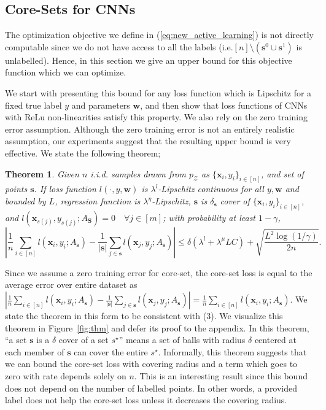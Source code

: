\documentclass{article} \usepackage{iclr2018_conference,times}
\makeatletter
\newtheorem{theorem}{Theorem}
\newcommand*{\ie}{i.e.\@\xspace}
\makeatother
\begin{document}
\subsection{Core-Sets for CNNs} 
The optimization objective we define in (\ref{eq:new_active_learning}) is not directly computable since we do not have
access to all the labels (\ie $[n] \setminus (\mathbf{s}^0 \cup \mathbf{s}^1)$ is unlabelled). Hence, in this section we
give an upper bound for this objective function which we can optimize. 

We start with presenting this bound for any loss function which is Lipschitz for a fixed true label $y$ and parameters $\mathbf{w}$, and then show that loss functions of CNNs with ReLu non-linearities satisfy this property. We also rely on the zero training error assumption. Although the zero training error is not an entirely realistic assumption,  our experiments suggest that the resulting upper bound is very effective. We state the following theorem;
\begin{theorem} Given $n$ i.i.d. samples drawn from $p_\mathcal{Z}$ as $\{\mathbf{x}_i,y_i\}_{i\in[n]}$, and set of
    points $\mathbf{s}$. If loss function $l(\cdot,y,\mathbf{w})$ is $\lambda^l$-Lipschitz continuous
    for all $y, \mathbf{w}$ and bounded by $L$, regression function is $\lambda^\eta$-Lipschitz, $\mathbf{s}$
    is $\delta_\mathbf{s}$ cover of $\{\mathbf{x}_i,y_i\}_{i\in[n]}$, and
    $l(\mathbf{x}_{s(j)},y_{s(j)}; A_\mathbf{S})=0\quad \forall j \in [m]$; with probability at least $1-\gamma$,
\[
    \left| \frac{1}{n}\sum_{i \in [n]} l(\mathbf{x}_i,y_i; A_{\mathbf{s}}) -
    \frac{1}{|\mathbf{s}|}\sum_{j \in \mathbf{s}} l(\mathbf{x}_j,y_j;A_{\mathbf{s}}) \right|  \leq \delta (\lambda^l + \lambda^\mu LC)+ \sqrt{\frac{L^2
    \log(1/\gamma)}{2n}}. \]
\label{mainthm2} \end{theorem}

Since we assume a zero training error for core-set, the core-set loss is equal to the average error over entire dataset as \mbox{$\left| \frac{1}{n}\sum_{i \in [n]} l(\mathbf{x}_i,y_i; A_{\mathbf{s}}) -
    \frac{1}{|\mathbf{s}|}\sum_{j \in \mathbf{s}} l(\mathbf{x}_j,y_j;A_{\mathbf{s}}) \right| = \frac{1}{n}\sum_{i \in [n]} l(\mathbf{x}_i,y_i; A_{\mathbf{s}})$}. We state the theorem in this form to be consistent with (3). We visualize this theorem in Figure~\ref{fig:thm} and defer its proof to the appendix. In this theorem, ``a set $\mathbf{s}$ is a $\delta$ cover of a set $s^\star$''  means a set of balls with radius
$\delta$ centered at each member of $\mathbf{s}$ can cover the entire $s^\star$. Informally, this theorem suggests that we can bound the core-set loss with covering radius and a term which goes to
zero with rate depends solely on $n$. This is an interesting result since this bound does not depend on the number of labelled points. In
other words, a provided label does not help the core-set loss unless it decreases the covering radius.
\end{document}

